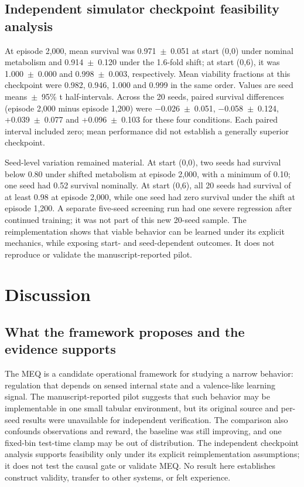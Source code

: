 \documentclass[twoside,11pt]{article}
\begin{document}
\subsection{Independent simulator checkpoint feasibility analysis}\label{sec:6.6}

At episode 2,000, mean survival was 0.971~$\pm$~0.051 at start (0,0) under nominal metabolism and 0.914~$\pm$~0.120 under the 1.6-fold shift; at start (0,6), it was 1.000~$\pm$~0.000 and 0.998~$\pm$~0.003, respectively. Mean viability fractions at this checkpoint were 0.982, 0.946, 1.000 and 0.999 in the same order. Values are seed means~$\pm$~95\% t half-intervals. Across the 20 seeds, paired survival differences (episode 2,000 minus episode 1,200) were $-$0.026~$\pm$~0.051, $-$0.058~$\pm$~0.124, +0.039~$\pm$~0.077 and +0.096~$\pm$~0.103 for these four conditions. Each paired interval included zero; mean performance did not establish a generally superior checkpoint.

Seed-level variation remained material. At start (0,0), two seeds had survival below 0.80 under shifted metabolism at episode 2,000, with a minimum of 0.10; one seed had 0.52 survival nominally. At start (0,6), all 20 seeds had survival of at least 0.98 at episode 2,000, while one seed had zero survival under the shift at episode 1,200. A separate five-seed screening run had one severe regression after continued training; it was not part of this new 20-seed sample. The reimplementation shows that viable behavior can be learned under its explicit mechanics, while exposing start- and seed-dependent outcomes. It does not reproduce or validate the manuscript-reported pilot.

\section{Discussion}\label{sec:7}

\subsection{What the framework proposes and the evidence supports}\label{sec:7.1}

The MEQ is a candidate operational framework for studying a narrow behavior: regulation that depends on sensed internal state and a valence-like learning signal. The manuscript-reported pilot suggests that such behavior may be implementable in one small tabular environment, but its original source and per-seed results were unavailable for independent verification. The comparison also confounds observations and reward, the baseline was still improving, and one fixed-bin test-time clamp may be out of distribution. The independent checkpoint analysis supports feasibility only under its explicit reimplementation assumptions; it does not test the causal gate or validate MEQ. No result here establishes construct validity, transfer to other systems, or felt experience.
\end{document}
